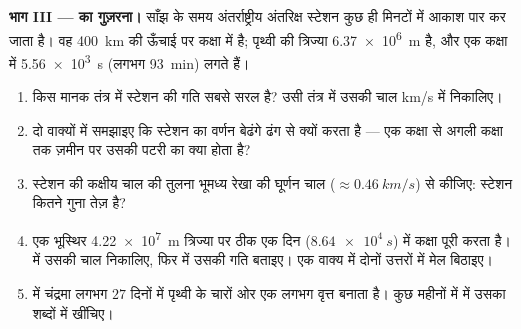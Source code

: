 \begin{problem}
\medskip
\noindent\textbf{भाग III ---  का गुज़रना।}
साँझ के समय अंतर्राष्ट्रीय अंतरिक्ष स्टेशन कुछ ही मिनटों में आकाश पार कर
जाता है। वह \qty{400}{km} की ऊँचाई पर कक्षा में है; पृथ्वी की
त्रिज्या \qty{6.37e6}{m} है, और एक कक्षा में \qty{5.56e3}{s} (लगभग \qty{93}{min})
लगते हैं।
\begin{enumerate}[resume]
  \item किस मानक तंत्र में स्टेशन की गति सबसे सरल है? उसी तंत्र में
        उसकी चाल \unit{km/s} में निकालिए।
  \item दो वाक्यों में समझाइए कि  स्टेशन का
        वर्णन बेढंगे ढंग से क्यों करता है --- एक कक्षा से अगली
        कक्षा तक ज़मीन पर उसकी पटरी का क्या होता है?
  \item स्टेशन की कक्षीय चाल की तुलना भूमध्य रेखा की घूर्णन चाल
        ($\approx \qty{0.46}{km/s}$) से कीजिए: स्टेशन कितने गुना तेज़ है?
  \item एक भूस्थिर  \qty{4.22e7}{m} त्रिज्या पर ठीक एक दिन
        ($\qty{8.64e4}{s}$) में कक्षा पूरी करता है।  में उसकी चाल निकालिए, फिर  में
        उसकी गति बताइए। एक वाक्य में दोनों उत्तरों में मेल बिठाइए।
  \item {} में चंद्रमा लगभग $27$ दिनों में
        पृथ्वी के चारों ओर एक लगभग वृत्त बनाता है। कुछ महीनों में
         में उसका  शब्दों में
        खींचिए।
\end{enumerate}


\end{problem}
